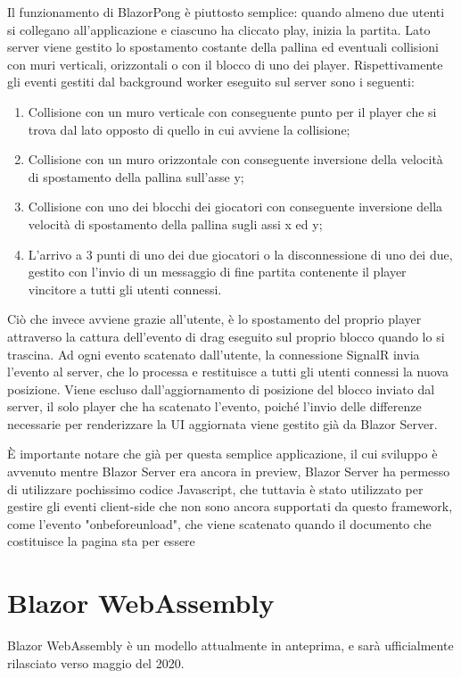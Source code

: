 Il funzionamento di BlazorPong \`e piuttosto semplice: quando almeno due utenti si collegano all'applicazione e ciascuno ha cliccato play, inizia la partita.
Lato server viene gestito lo spostamento costante della pallina ed eventuali collisioni con muri verticali, orizzontali o con il blocco di uno dei player.
Rispettivamente gli eventi gestiti dal background worker eseguito sul server sono i seguenti:
\begin{enumerate}
	\item Collisione con un muro verticale con conseguente punto per il player che si trova dal lato opposto di quello in cui avviene la collisione;
	\item Collisione con un muro orizzontale con conseguente inversione della velocit\`a di spostamento della pallina sull'asse y;
	\item Collisione con uno dei blocchi dei giocatori con conseguente inversione della velocit\`a di spostamento della pallina sugli assi x ed y;
	\item L'arrivo a 3 punti di uno dei due giocatori o la disconnessione di uno dei due, gestito con l'invio di un messaggio di fine partita contenente il player vincitore a tutti gli utenti connessi.
\end{enumerate}

Ci\`o che invece avviene grazie all'utente, \`e lo spostamento del proprio player attraverso la cattura dell'evento di drag eseguito sul proprio blocco quando lo si trascina.
Ad ogni evento scatenato dall'utente, la connessione SignalR invia l'evento al server, che lo processa e restituisce a tutti gli utenti connessi la nuova posizione.
Viene escluso dall'aggiornamento di posizione del blocco inviato dal server, il solo player che ha scatenato l'evento, poich\'e l'invio delle differenze necessarie per renderizzare la UI aggiornata viene gestito gi\`a da Blazor Server.

\`E importante notare che gi\`a per questa semplice applicazione, il cui sviluppo \`e avvenuto mentre Blazor Server era ancora in preview, Blazor Server ha permesso di utilizzare pochissimo codice Javascript, che tuttavia \`e stato utilizzato per gestire gli eventi client-side che non sono ancora supportati da questo framework, come l'evento "onbeforeunload", che viene scatenato quando il documento che costituisce la pagina sta per essere 

\pagebreak

\section{Blazor WebAssembly}\label{sez:bwa}
Blazor WebAssembly \`e un modello attualmente in anteprima, e sar\`a ufficialmente rilasciato verso maggio del 2020.

